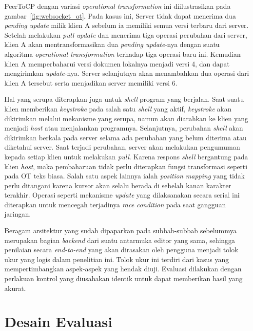 PeerToCP dengan variasi \textit{operational transformation} ini diilustrasikan pada gambar~\ref{fig:websocket_ot}. Pada kasus ini, Server tidak dapat menerima dua \textit{pending update} milik klien A sebelum ia memiliki semua versi terbaru dari server. Setelah melakukan \textit{pull update} dan menerima tiga operasi perubahan dari server, klien A akan mentransformasikan dua \textit{pending update}-nya dengan suatu algoritma \textit{operational transformation} terhadap tiga operasi baru ini. Kemudian klien A memperbaharui versi dokumen lokalnya menjadi versi 4, dan dapat mengirimkan \textit{update}-nya. Server selanjutnya akan menambahkan dua operasi dari klien A tersebut serta menjadikan server memiliki versi 6.

Hal yang serupa diterapkan juga untuk \textit{shell} program yang berjalan. Saat suatu klien memberikan \textit{keystroke} pada salah satu \textit{shell} yang aktif, \textit{keystroke} akan dikirimkan melalui mekanisme yang serupa, namun akan diarahkan ke klien yang menjadi \textit{host} atau menjalankan programnya. Selanjutnya, perubahan \textit{shell} akan dikirimkan berkala pada server selama ada perubahan yang belum diterima atau diketahui server. Saat terjadi perubahan, server akan melakukan pengumuman kepada setiap klien untuk melakukan \textit{pull}. Karena respons \textit{shell} bergantung pada klien \textit{host}, maka pembaharuan tidak perlu diterapkan fungsi transformasi seperti pada OT teks biasa. Salah satu aspek lainnya ialah \textit{position mapping} yang tidak perlu ditangani karena kursor akan selalu berada di sebelah kanan karakter terakhir. Operasi seperti mekanisme \textit{update} yang dilaksanakan secara serial ini diterapkan untuk mencegah terjadinya \textit{race condition} pada saat gangguan jaringan.

Beragam arsitektur yang sudah dipaparkan pada subbab-subbab sebelummya merupakan bagian \textit{backend} dari suatu antarmuka editor yang sama, sehingga penilaian secara \textit{end-to-end} yang akan dirasakan oleh pengguna menjadi tolok ukur yang logis dalam penelitian ini. Tolok ukur ini terdiri dari kasus yang mempertimbangkan aspek-aspek yang hendak diuji. Evaluasi dilakukan dengan perlakuan kontrol yang diusahakan identik untuk dapat memberikan hasil yang akurat.

\section{Desain Evaluasi}
\label{sec:desain_evaluasi}

